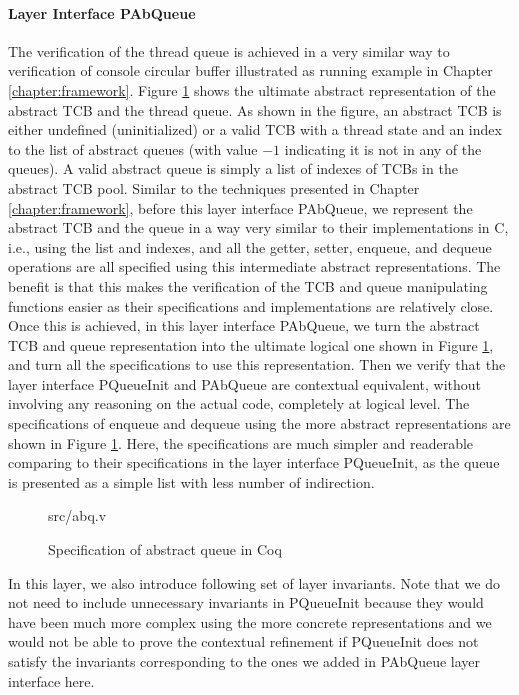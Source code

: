 \paragraph{Layer Interface PAbQueue}

The verification of the thread queue is achieved in a very similar way to
verification of console circular buffer illustrated as running example in Chapter \ref{chapter:framework}.
Figure \ref{fig:abq_v} shows the ultimate abstract representation of the abstract TCB and the thread queue.
As shown in the figure, an abstract TCB is either undefined (uninitialized) or a valid TCB with a thread state
and an index to the list of abstract queues (with value $-1$ indicating it is not in any of the queues).
A valid abstract queue is simply a list of indexes of TCBs in the abstract TCB pool.
Similar to the techniques presented in Chapter \ref{chapter:framework}, before this layer interface
PAbQueue, we represent the abstract TCB and the queue in a way very similar to their implementations in C, i.e.,
using the list and indexes, and all the getter, setter, enqueue, and dequeue operations are all specified using
this intermediate abstract representations. The benefit is that this makes the verification of the TCB and queue
manipulating functions easier as their specifications and implementations are relatively close.
Once this is achieved, in this layer interface PAbQueue, we turn the abstract TCB and queue representation
into the ultimate logical one shown in Figure \ref{fig:abq_v}, and turn all the specifications to use this representation.
Then we verify that the layer interface PQueueInit and PAbQueue are contextual equivalent, without involving any
reasoning on the actual code, completely at logical level.
The specifications of \textsf{enqueue} and \textsf{dequeue} using the more abstract representations are
shown in Figure \ref{fig:abq_v}. Here, the specifications are much simpler and readerable comparing to their
specifications in the layer interface PQueueInit, as the queue is presented as a simple list with less number of
indirection.

\begin{figure}
	 {src/abq.v}
	\caption{Specification of abstract queue in Coq}
	\label{fig:abq_v}
\end{figure}

In this layer, we also introduce following set of layer invariants. Note that we do not need to include unnecessary
invariants in PQueueInit because they would have been much more complex using the more concrete
representations and we would not be able to prove the contextual refinement if PQueueInit does not satisfy
the invariants corresponding to the ones we added in PAbQueue layer interface here.

